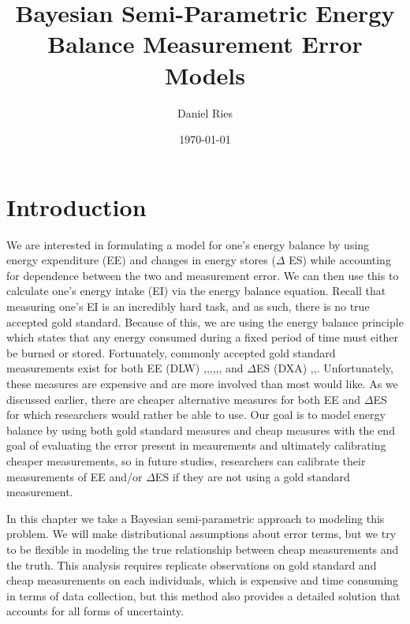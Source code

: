 \documentclass[11pt]{article}\usepackage[]{graphicx}\usepackage[]{color}
\begin{document}
\title{Bayesian Semi-Parametric Energy Balance Measurement Error Models}
\author{Daniel Ries}
\date{\today}
\maketitle

\section{Introduction}

We are interested in formulating a model for one's energy balance by using energy expenditure (EE) and changes in energy stores ($\Delta$ ES) while accounting for dependence between the two and measurement error. We can then use this to calculate one's energy intake (EI) via the energy balance equation.   Recall that measuring one's EI is an incredibly hard task, and as such, there is no true accepted gold standard. Because of this, we are using the energy balance principle which states that any energy consumed during a fixed period of time must either be burned or stored. Fortunately, commonly accepted gold standard measurements exist for both EE (DLW) \cite{lagerros},\cite{bouten},\cite{thomas11},\cite{hall11},\cite{gilmore},\cite{sanghvi15}, \cite{racette11} and $\Delta$ES (DXA) \cite{thomas11},\cite{sanghvi15},\cite{gilmore}. Unfortunately, these measures are expensive and are more involved than most would like. As we discussed earlier, there are cheaper alternative measures for both EE and $\Delta$ES for which researchers would rather be able to use. Our goal is to model energy balance by using both gold standard measures and cheap measures with the end goal of evaluating the error present in meaurements and ultimately calibrating cheaper measurements, so in future studies, researchers can calibrate their measurements of EE and/or $\Delta$ES if they are not using a gold standard measurement.

In this chapter we take a Bayesian semi-parametric approach to modeling this problem. We will make distributional assumptions about error terms, but we try to be flexible in modeling the true relationship between cheap measurements and the truth. This analysis requires replicate observations on gold standard and cheap measurements on each individuals, which is expensive and time consuming in terms of data collection, but this method also provides a detailed solution that accounts for all forms of uncertainty.
\end{document}
